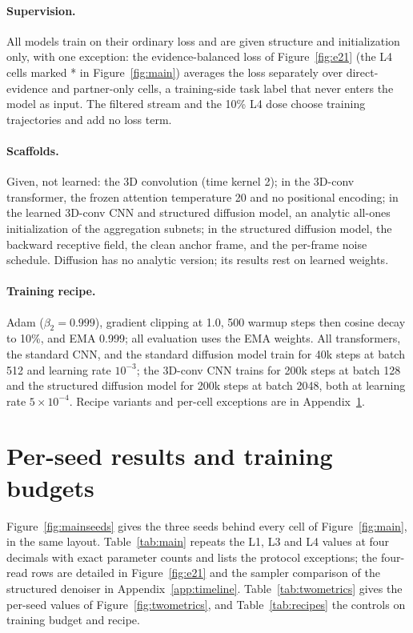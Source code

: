 \documentclass[11pt]{article}
\begin{document}
\paragraph{Supervision.}
All models train on their ordinary loss and are given structure and initialization only, with one exception: the evidence-balanced loss of Figure~\ref{fig:e21} (the L4 cells marked * in Figure~\ref{fig:main}) averages the loss separately over direct-evidence and partner-only cells, a training-side task label that never enters the model as input. The filtered stream and the 10\% L4 dose choose training trajectories and add no loss term.

\paragraph{Scaffolds.}
Given, not learned: the 3D convolution (time kernel 2); in the 3D-conv transformer, the frozen attention temperature 20 and no positional encoding; in the learned 3D-conv CNN and structured diffusion model, an analytic all-ones initialization of the aggregation subnets; in the structured diffusion model, the backward receptive field, the clean anchor frame, and the per-frame noise schedule. Diffusion has no analytic version; its results rest on learned weights.

\paragraph{Training recipe.}
Adam ($\beta_2=0.999$), gradient clipping at 1.0, 500 warmup steps then cosine decay to 10\%, and EMA 0.999; all evaluation uses the EMA weights. All transformers, the standard CNN, and the standard diffusion model train for 40k steps at batch 512 and learning rate $10^{-3}$; the 3D-conv CNN trains for 200k steps at batch 128 and the structured diffusion model for 200k steps at batch 2048, both at learning rate $5\times10^{-4}$. Recipe variants and per-cell exceptions are in Appendix~\ref{app:recipes}.

\section{Per-seed results and training budgets}
\label{app:recipes}

Figure~\ref{fig:mainseeds} gives the three seeds behind every cell of Figure~\ref{fig:main}, in the same layout. Table~\ref{tab:main} repeats the L1, L3 and L4 values at four decimals with exact parameter counts and lists the protocol exceptions; the four-read rows are detailed in Figure~\ref{fig:e21} and the sampler comparison of the structured denoiser in Appendix~\ref{app:timeline}. Table~\ref{tab:twometrics} gives the per-seed values of Figure~\ref{fig:twometrics}, and Table~\ref{tab:recipes} the controls on training budget and recipe.
\end{document}
